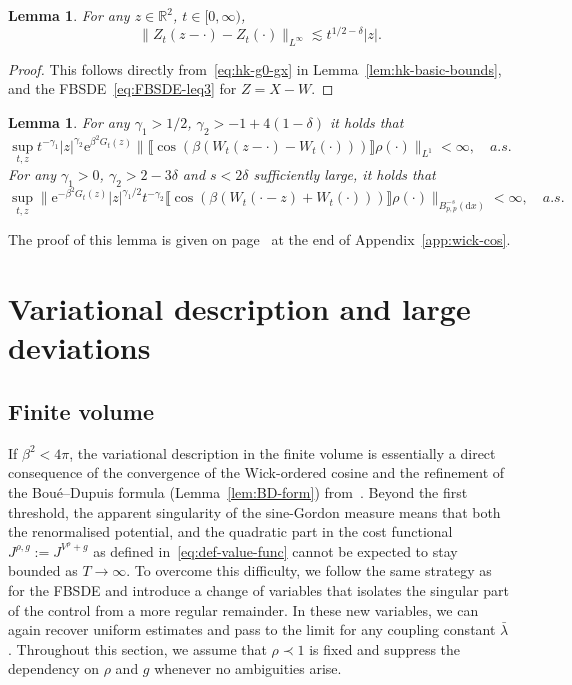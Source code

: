 \documentclass[11pt, a4paper]{scrartcl}
\numberwithin{equation}{section}
\theoremstyle{plain}
\newtheorem{lemma}[foo]{Lemma}
\theoremstyle{remark}
\newcommand{\assign}{:=}
\newcommand{\mathd}{\mathrm{d}}
\newcommand{\mathe}{\mathrm{e}}
\newcommand{\tmtextbf}[1]{\text{{\bfseries{#1}}}}
\begin{document}
\begin{lemma}
	\label{lem:Z-Linfty}For any $z \in \mathbb{R}^2$, $t \in [0, \infty)$,
	\[ \| Z_t (z - \cdot) - Z_t (\cdot) \|_{L^{\infty}} \lesssim t^{1 / 2 -
				\delta} | z | . \]
\end{lemma}

\begin{proof}
	This follows directly from~\eqref{eq:hk-g0-gx} in
	Lemma~\ref{lem:hk-basic-bounds}, and the FBSDE~\eqref{eq:FBSDE-leq3} for
	$Z = X - W$.
\end{proof}

\begin{lemma}
	\label{lem:sing-wick-estimates}\tmtextbf{(N)} For any $\gamma_1 > 1 / 2$,
	$\gamma_2 > - 1 + 4 (1 - \delta)$ it holds that
	\[ \sup_{t, z} t^{- \gamma_1} | z |^{\gamma_2} \mathe^{\beta^2 G_t (z)} \|
		\llbracket \cos (\beta (W_t (z - \cdot) - W_t (\cdot))) \rrbracket \rho
		(\cdot) \|_{L^1}  < \infty, \quad a.s. \]
	\tmtextbf{(C)} For any $\gamma_1 > 0$, $\gamma_2 > 2 - 3 \delta$ and $s < 2
		\delta$ sufficiently large, it holds that
	\[ \sup_{t, z} \| \mathe^{- \beta^2 G_t (z)} | z |^{\gamma_1 / 2} t^{-
				\gamma_2} \llbracket \cos (\beta (W_t (\cdot - z) + W_t (\cdot)))
		\rrbracket \rho (\cdot) \|_{B^{- s}_{p, p} (\mathd x)} < \infty, \quad
		a.s. \]
\end{lemma}

The proof of this lemma is given on page~\pageref{proof-lemma-NC} at the end
of Appendix~\ref{app:wick-cos}.

\section{Variational description and large deviations}\label{sec:Var+LDP}
\subsection{Finite volume}

If $\beta^2 < 4 \pi$, the variational description in the finite volume is
essentially a direct consequence of the convergence of the Wick-ordered cosine
and the refinement of the Bou{\'e}--Dupuis formula (Lemma~\ref{lem:BD-form})
from~{\cite{ustunelVariationalCalculationLaplace2014}}. Beyond the first
threshold, the apparent singularity of the sine-Gordon measure means that both
the renormalised potential, and the quadratic part in the cost functional
$J^{\rho, g} \assign J^{V^{\rho} + g}$ as defined in~\eqref{eq:def-value-func}
cannot be expected to stay bounded as $T \rightarrow \infty$. To overcome this
difficulty, we follow the same strategy as for the FBSDE and introduce a
change of variables that isolates the singular part of the control from a more
regular remainder. In these new variables, we can again recover uniform
estimates and pass to the limit for any coupling constant $\bar{\lambda}$.
Throughout this section, we assume that $\rho \prec 1$ is fixed and suppress the
dependency on $\rho$ and $g$ whenever no ambiguities arise.
\end{document}

